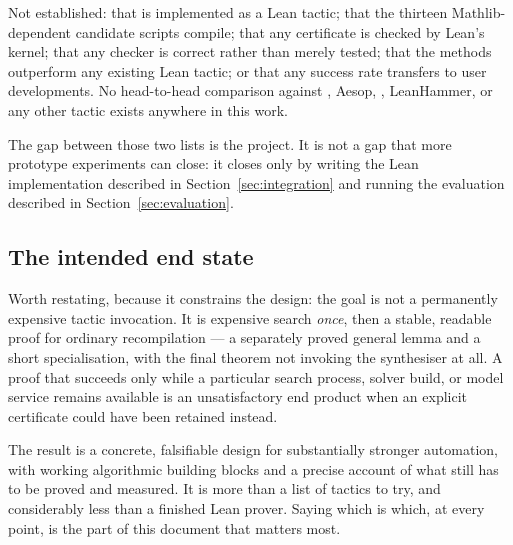 Not established: that \forge{} is implemented as a Lean tactic; that the
thirteen Mathlib-dependent candidate scripts compile; that any certificate is
checked by Lean's kernel; that any checker is correct rather than merely tested;
that the methods outperform any existing Lean tactic; or that any success rate
transfers to user developments. No head-to-head comparison against \grind{},
Aesop, , LeanHammer, or any other tactic exists anywhere in this
work.

The gap between those two lists is the project. It is not a gap that more
prototype experiments can close: it closes only by writing the Lean
implementation described in Section~\ref{sec:integration} and running the
evaluation described in Section~\ref{sec:evaluation}.

\subsection{The intended end state}

Worth restating, because it constrains the design: the goal is not a permanently
expensive tactic invocation. It is expensive search \emph{once}, then a stable,
readable proof for ordinary recompilation --- a separately proved general lemma
and a short specialisation, with the final theorem not invoking the synthesiser
at all. A proof that succeeds only while a particular search process, solver
build, or model service remains available is an unsatisfactory end product when
an explicit certificate could have been retained instead.

The result is a concrete, falsifiable design for substantially stronger
automation, with working algorithmic building blocks and a precise account of
what still has to be proved and measured. It is more than a list of tactics to
try, and considerably less than a finished Lean prover. Saying which is which,
at every point, is the part of this document that matters most.
